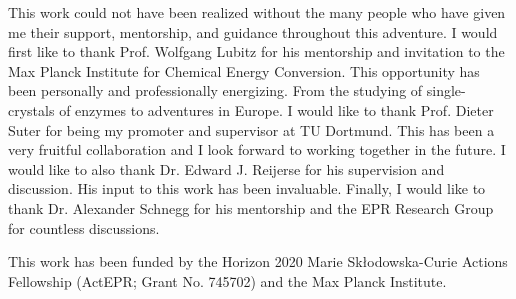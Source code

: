 
This work could not have been realized without the many people who have given me their support, mentorship, and guidance throughout this adventure. I would first like to thank Prof. Wolfgang Lubitz for his mentorship and invitation to the Max Planck Institute for Chemical Energy Conversion. This opportunity has been personally and professionally energizing. From the studying of single-crystals of enzymes to adventures in Europe. I would like to thank Prof. Dieter Suter for being my promoter and supervisor at TU Dortmund. This has been a very fruitful collaboration and I look forward to working together in the future. I would like to also thank Dr. Edward J. Reijerse for his supervision and discussion. His input to this work has been invaluable. Finally, I would like to thank Dr. Alexander Schnegg for his mentorship and the EPR Research Group for countless discussions. 

This work has been funded by the Horizon 2020 Marie Sk\l{}odowska-Curie Actions Fellowship (ActEPR; Grant No. 745702) and the Max Planck Institute. 

